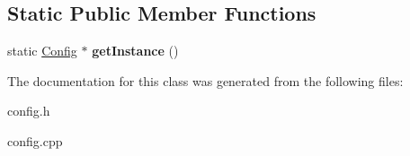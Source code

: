 \subsection*{Static Public Member Functions}
\begin{DoxyCompactItemize}
\item 
static \hyperlink{classConfig}{Config} $\ast$ {\bfseries get\+Instance} ()\hypertarget{classConfig_af7d6f89fc34627f15523df0b62acd7e5}{}\label{classConfig_af7d6f89fc34627f15523df0b62acd7e5}

\end{DoxyCompactItemize}


The documentation for this class was generated from the following files\+:\begin{DoxyCompactItemize}
\item 
config.\+h\item 
config.\+cpp\end{DoxyCompactItemize}
